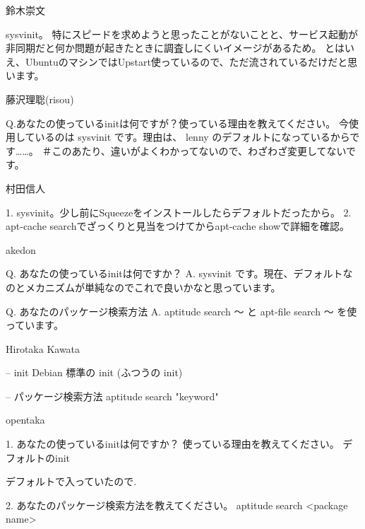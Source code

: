 \begin{prework}{ 鈴木崇文 }

sysvinit。
特にスピードを求めようと思ったことがないことと、サービス起動が非同期だと何か問題が起きたときに調査しにくいイメージがあるため。
とはいえ、UbuntuのマシンではUpstart使っているので、ただ流されているだけだと思います。

\end{prework}



\begin{prework}{ 藤沢理聡(risou) }

Q.あなたの使っているinitは何ですが？使っている理由を教えてください。
今使用しているのは sysvinit です。理由は、 lenny のデフォルトになっているからです……。
＃このあたり、違いがよくわかってないので、わざわざ変更してないです。

\end{prework}



\begin{prework}{ 村田信人 }

1. sysvinit。少し前にSqueezeをインストールしたらデフォルトだったから。
2. apt-cache searchでざっくりと見当をつけてからapt-cache showで詳細を確認。

\end{prework}



\begin{prework}{ akedon }

Q. あなたの使っているinitは何ですか？
A. sysvinit です。現在、デフォルトなのとメカニズムが単純なのでこれで良いかなと思っています。

Q. あなたのパッケージ検索方法
A. aptitude search 〜 と apt-file search 〜 を使っています。


\end{prework}



\begin{prework}{ Hirotaka Kawata }

-- init
Debian 標準の init (ふつうの init)

-- パッケージ検索方法
aptitude search "keyword"


\end{prework}



\begin{prework}{ opentaka }

1. あなたの使っているinitは何ですか？
使っている理由を教えてください。
デフォルトのinit

デフォルトで入っていたので.

2. あなたのパッケージ検索方法を教えてください。
aptitude search <package name>

\end{prework}



